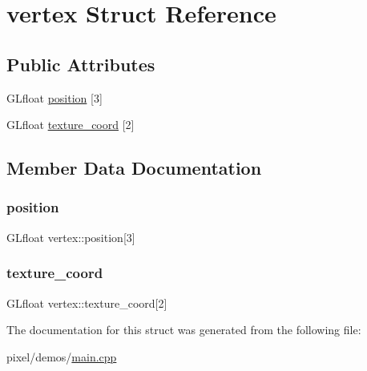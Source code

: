 \hypertarget{structvertex}{}\section{vertex Struct Reference}
\label{structvertex}
\subsection*{Public Attributes}
\begin{DoxyCompactItemize}
\item 
G\+Lfloat \hyperlink{structvertex_a901f48b4115fb7855d39aa3a8f7d6627}{position} \mbox{[}3\mbox{]}
\item 
G\+Lfloat \hyperlink{structvertex_af8b7ebec37c34d9905c8b2a37bb9446b}{texture\+\_\+coord} \mbox{[}2\mbox{]}
\end{DoxyCompactItemize}


\subsection{Member Data Documentation}
\mbox{\label{structvertex_a901f48b4115fb7855d39aa3a8f7d6627}} 
\subsubsection{\texorpdfstring{position}{position}}
{\footnotesize\ttfamily G\+Lfloat vertex\+::position\mbox{[}3\mbox{]}}

\mbox{\label{structvertex_af8b7ebec37c34d9905c8b2a37bb9446b}} 
\subsubsection{\texorpdfstring{texture\+\_\+coord}{texture\_coord}}
{\footnotesize\ttfamily G\+Lfloat vertex\+::texture\+\_\+coord\mbox{[}2\mbox{]}}



The documentation for this struct was generated from the following file\+:\begin{DoxyCompactItemize}
\item 
pixel/demos/\hyperlink{demos_2main_8cpp}{main.\+cpp}\end{DoxyCompactItemize}
